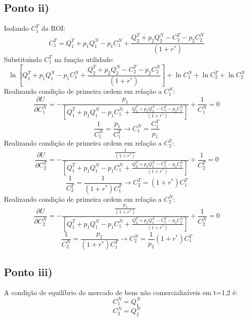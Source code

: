 \documentclass{article}
\begin{document}
\subsection*{Ponto ii)}
Isolando $C_1^T$ da ROI:
\begin{equation*}
     C_1^T = Q_1^T + p_1 Q_1^N-p_1 C_1^N + \frac{Q_2^T + p_2 Q_2^N- C_2^T - p_2 C_2^N}{(1+r^*)}
\end{equation*}
Substituindo $C_1^T$ na função utilidade:
\begin{equation*}
    \ln \left[Q_1^T + p_1 Q_1^N-p_1 C_1^N + \frac{Q_2^T + p_2 Q_2^N- C_2^T - p_2 C_2^N}{(1+r^*)}\right] + \ln C_1^N + \ln C_2^T + \ln C_2^N
\end{equation*}
Realizando condição de primeira ordem em relação a $C_1^N$:
\begin{equation*}
    \frac{\partial U}{\partial C_1^N} =
    -\frac{p_1}{\left[Q_1^T + p_1 Q_1^N-p_1 C_1^N + \frac{Q_2^T + p_2 Q_2^N- C_2^T - p_2 C_2^N}{(1+r^*)}\right]}+\frac{1}{C_1^N}=0
\end{equation*}
\begin{equation}\label{eq:cn1}
    \frac{1}{C_1^N}=\frac{p_1}{C_1^T} \to C_1^N=\frac{C_1^T}{p_1}
\end{equation}
Realizando condição de primeira ordem em relação a $C_2^T$:
\begin{equation*}
    \frac{\partial U}{\partial C_2^T} =
    -\frac{\frac{1}{(1+r^*)}}{\left[Q_1^T + p_1 Q_1^N-p_1 C_1^N + \frac{Q_2^T + p_2 Q_2^N- C_2^T - p_2 C_2^N}{(1+r^*)}\right]}+\frac{1}{C_2^T}=0
\end{equation*}
\begin{equation}\label{eq:c2teqc1t}
    \frac{1}{C_2^T}=\frac{1}{(1+r^*)C_1^T} \to C_2^T=(1+r^*)C_1^T
\end{equation}
Realizando condição de primeira ordem em relação a $C_2^N$:
\begin{equation*}
    \frac{\partial U}{\partial C_2^N} =
    -\frac{\frac{p_2}{(1+r^*)}}{\left[Q_1^T + p_1 Q_1^N-p_1 C_1^N + \frac{Q_2^T + p_2 Q_2^N- C_2^T - p_2 C_2^N}{(1+r^*)}\right]}+\frac{1}{C_2^N}=0
\end{equation*}
\begin{equation}\label{eq:cn2}
    \frac{1}{C_2^N}=\frac{p_2}{(1+r^*)C_1^T} \to C_2^N=\frac{1}{p_2}(1+r^*)C_1^T
\end{equation}
\subsection*{Ponto iii)}
A condição de equilíbrio do mercado de bens não comercializáveis em t=1,2 é:
\begin{equation}\label{eq:cond1}
    C_1^N=Q_1^N
\end{equation}
\begin{equation}\label{eq:cond2}
    C_2^N=Q_2^N
\end{equation}
\end{document}
